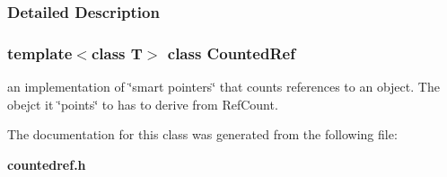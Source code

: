 \subsubsection{Detailed Description}
\subsubsection*{template$<$class T$>$  class Counted\-Ref}

an implementation of \char`\"{}smart pointers\char`\"{} that counts references to an object. The obejct it \char`\"{}points\char`\"{} to has to derive from Ref\-Count.



The documentation for this class was generated from the following file:\begin{CompactItemize}
\item 
{\bf countedref.h}\end{CompactItemize}
